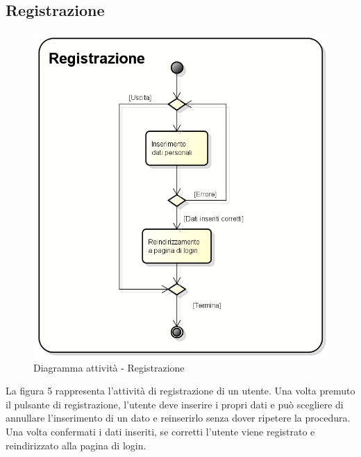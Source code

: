 \subsection{Registrazione}
\begin{figure}[h] 
	\centering 
	\includegraphics[scale=0.3] {img/activity_registrazione.png} 
	\caption{Diagramma attività - Registrazione} 
\end{figure}
La figura 5 rappresenta l'attività di registrazione di un utente. Una volta premuto il pulsante di registrazione, l'utente deve inserire i propri dati e può scegliere di annullare l'inserimento di un dato e reinserirlo senza dover ripetere la procedura. Una volta confermati i dati inseriti, se corretti l'utente viene registrato e reindirizzato alla pagina di login.
\newpage


